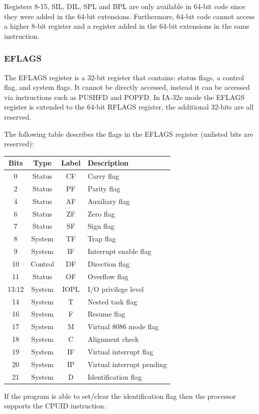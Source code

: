 \documentclass{article}
\newcommand{\layout}[1]{\parbox{\linewidth}{#1}}
\begin{document}
\layout{
  Registers 8-15, SIL, DIL, SPL and BPL are only available in 64-bit code since they were added in the 64-bit extensions.
  Furthermore, 64-bit code cannot access a higher 8-bit register and a register added in the 64-bit extensions in the same instruction.

  \bigskip \cite[Chapter~3.4.1]{sdm1}
}

\layout{
  \subsubsection{EFLAGS}

  The EFLAGS register is a 32-bit register that contains: status flags, a control flag, and system flags.
  It cannot be directly accessed, instead it can be accessed via instructions such as PUSHFD and POPFD.
  In IA-32e mode the EFLAGS register is extended to the 64-bit RFLAGS register, the additional 32-bits are all reserved.
} \bigskip

\layout{
  The following table describes the flags in the EFLAGS register (unlisted bits are reserved):
  \begin{table}[H]
    \centering
    \begin{tabular}{|c|c|c|l|}
      \hline \textbf{Bits} & \textbf{Type} & \textbf{Label} & \textbf{Description} \\ \hline
      0 & Status & CF & Carry flag \\
      2 & Status & PF & Parity flag \\
      4 & Status & AF & Auxiliary flag \\
      6 & Status & ZF & Zero flag \\
      7 & Status & SF & Sign flag \\
      8 & System & TF & Trap flag \\
      9 & System & IF & Interrupt enable flag \\
      10 & Control & DF & Direction flag \\
      11 & Status & OF & Overflow flag \\
      13:12 & System & IOPL & I/O privilege level \\
      14 & System & T & Nested task flag \\
      16 & System & F & Resume flag \\
      17 & System & M & Virtual 8086 mode flag \\
      18 & System & C & Alignment check \\
      19 & System & IF & Virtual interrupt flag \\
      20 & System & IP & Virtual interrupt pending \\
      21 & System & D & Identification flag \\ \hline
    \end{tabular}
  \end{table}

  If the program is able to set/clear the identification flag then the processor supports the CPUID instruction.

  \bigskip \cite[Chapter~3.4.3]{sdm1}
}
\end{document}
